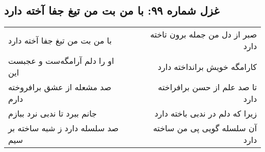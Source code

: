 \begin{center}
\section*{غزل شماره ۹۹: با من بت من تیغ جفا آخته دارد}
\label{sec:099}
\begin{longtable}{l p{0.5cm} r}
با من بت من تیغ جفا آخته دارد
&&
صبر از دل من جمله برون تاخته دارد
\\
او را دلم آرامگه‌ست و عجبست این
&&
کارامگه خویش برانداخته دارد
\\
صد مشعله از عشق برافروخته دارم
&&
تا صد علم از حسن برافراخته دارد
\\
جانم ببرد تا ندبی نرد ببازم
&&
زیرا که دلم در ندبی باخته دارد
\\
صد سلسله دارد ز شبه ساخته بر سیم
&&
آن سلسله گویی پی من ساخته دارد
\\
\end{longtable}
\end{center}
